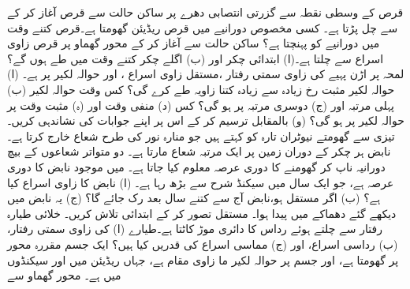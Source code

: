 قرص کے وسطی نقطہ سے گزرتی انتصابی دھرے  پر  ساکن حالت سے قرص آغاز کر کے  سے چل پڑتا ہے۔ کسی
 مخصوص  دورانیے میں قرص   ریڈیئن گھومتا ہے۔قرص کتنے  وقت  میں دورانیے کو پہنچتا ہے؟
ساکن حالت سے آغاز کر کے محور گھماو پر قرص   زاوی اسراع  سے چلتا ہے۔(ا)  ابتدائی  چکر  اور (ب) اگلے  چکر کتنے وقت میں طے ہوں گے؟
لمحہ  پر اڑن پہیے کی زاوی سمتی رفتار ،مستقل  زاوی اسراع ، اور    حوالہ لکیر    پر ہے۔ (ا) حوالہ لکیر مثبت رخ  زیادہ سے زیادہ کتنا زاویہ طے کرے گی؟ کس وقت حوالہ لکیر  (ب) پہلی مرتبہ اور (ج) دوسری مرتبہ    پر ہو گی؟ کس (د) منفی وقت   اور (ہ) مثبت وقت پر  حوالہ لکیر   پر ہو گی؟ (و)  بالمقابل  ترسیم کر کے اس پر اپنے جوابات  کی نشاندہی کریں۔
  تیزی سے گھومتے   نیوٹران  تارہ  کو کہتے ہیں جو منارہ  نور  کی طرح شعاع  خارج کرتا ہے۔ نابض  ہر چکر   کے دوران زمین پر ایک  مرتبہ شعاع مارتا ہے۔ دو  متواتر شعاعوں کے بیچ دورانیہ   ناپ کر گھومنے کا دوری عرصہ    معلوم کیا جاتا ہے۔   میں موجود نابض کا دوری عرصہ  ہے، جو ایک سال میں   سیکنڈ  شرح سے  بڑھ رہا ہے۔ (ا) نابض کا    زاوی اسراع   کیا ہے؟ (ب)  اگر  مستقل ہو،نابض  آج سے کتنے سال  بعد  رک جائے گا؟ (ج)  یہ نابض   میں دیکھے گئے     دھماکے میں پیدا ہوا۔ مستقل  تصور کر  کے ابتدائی  تلاش کریں۔
خلائی طیارہ  رفتار سے چلتے ہوئے  رداس کا  دائری  موڑ کاٹتا  ہے۔طیارے   (ا) کی زاوی سمتی رفتار، (ب) رداسی اسراع، اور (ج) مماسی اسراع کی قدریں   کیا  ہیں؟
ایک جسم مقررہ محور  پر گھومتا ہے، اور  جسم پر حوالہ لکیر ما زاوی مقام  ہے، جہاں   ریڈیئن میں اور  سیکنڈوں  میں ہے۔ محور گھماو سے
